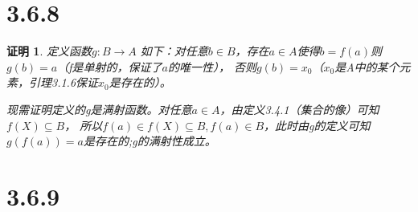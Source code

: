 \documentclass{article}
\theoremstyle{mystyle}
\theoremstyle{zproofstyle}
\newtheorem*{zproof}{证明}
\begin{document}
\section*{3.6.8}
\begin{zproof}
  定义函数$g: B \rightarrow A$
  如下：对任意$b \in B$，存在$a \in A$使得$b=f(a)$则$g(b)=a$（f是单射的，保证了$a$的唯一性），
  否则$g(b)=x_0$（$x_0$是A中的某个元素，引理3.1.6保证$x_0$是存在的）。

  现需证明定义的g是满射函数。对任意$a \in A$，由定义3.4.1（集合的像）可知$f(X) \subseteq B$，
  所以$f(a) \in f(X) \subseteq B, f(a) \in B$，此时由g的定义可知$g(f(a))=a$是存在的;g的满射性成立。
\end{zproof}

\section*{3.6.9}
\end{document}
